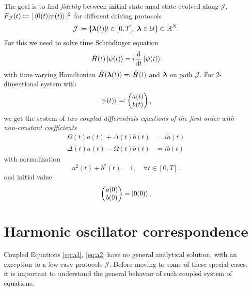 The goal is to find \emph{fidelity} between initial state anad state evolved along $\mathcal J$, $F_{\mathcal J}(t)\coloneqq |\braket{0(t)|\psi(t)}|^2$ for different driving protocols \begin{equation}
    \mathcal J\coloneqq\{{\bm\lambda}(t)|t\in[0,T],\; {\bm\lambda}\in \mathcal U\} \subset \mathbb{R}^N.
\end{equation}
For this we need to solve time Schr\"odinger equation
\begin{equation}
    \hat{H}(t)\ket{\psi(t)}=i\frac{\mathrm{d}}{\mathrm{d} t}\ket{\psi(t)}
\end{equation}
with time varying Hamiltonian $\hat{H}({\bm\lambda}(t))\eqqcolon \hat{H}(t)$ and ${\bm\lambda}$ on path $\mathcal J$. For 2-dimentional system with 
\begin{equation}
    \ket{\psi(t)}\eqqcolon \begin{pmatrix}
         a(t) \\
         b(t)    
    \end{pmatrix},
\end{equation}
we get the system of \emph{two coupled differentials equations of the first order with non-constant coefficients}
\begin{align}
    \Omega(t)a(t)+\Delta(t)b(t)&=i\dot a(t)\label{eq:a1}\\
    \Delta(t)a(t)-\Omega(t)b(t)&=i\dot b(t)
    \label{eq:a2}
\end{align}
with normalization
\begin{equation}
    a^2(t)+b^2(t)=1, \quad \forall t\in [0,T].
    \label{eq:normalizationCondition}
\end{equation}
and initial value 
\begin{equation}
    \begin{pmatrix}
        a(0)\\b(0)
    \end{pmatrix} = \ket{0(0)}.
\end{equation}















\section{Harmonic oscillator correspondence}
Coupled Equations \ref{eq:a1}, \ref{eq:a2} have no general analytical solution, with an exception to a few easy protocols $\mathcal J$. Before moving to some of these special cases, it is important to understand the general behavior of such coupled system of equations.

